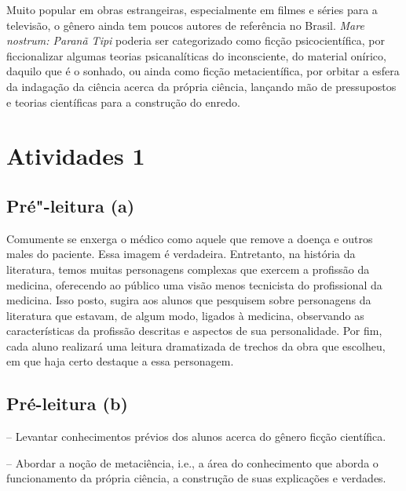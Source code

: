 \documentclass[12pt]{extarticle}
\begin{document}
Muito popular em obras estrangeiras, especialmente em filmes e séries para a televisão, o gênero ainda tem poucos autores de referência no Brasil. \textit{Mare nostrum: Paranã Tipi} poderia ser categorizado como ficção psicocientífica, por ficcionalizar algumas teorias psicanalíticas do inconsciente, do material onírico, daquilo que é o sonhado, ou ainda como ficção metacientífica, por orbitar a esfera da indagação da ciência acerca da própria ciência, lançando mão de pressupostos e teorias científicas para a construção do enredo.

\section{Atividades 1}

\subsection{Pré"-leitura (a)}

\bnccativividadespreleitura


Comumente se enxerga o médico como aquele que remove a
doença e outros males do paciente. Essa imagem é verdadeira. Entretanto,
na história da literatura, temos muitas personagens complexas que
exercem a profissão da medicina, oferecendo ao público uma visão menos
tecnicista do profissional da medicina. Isso posto, sugira aos alunos
que pesquisem sobre personagens da literatura que estavam, de algum
modo, ligados à medicina, observando as características da profissão
descritas e aspectos de sua personalidade. Por fim, cada aluno realizará
uma leitura dramatizada de trechos da obra que escolheu, em que haja
certo destaque a essa personagem.

\subsection{Pré-leitura (b)}

-- Levantar conhecimentos prévios dos alunos acerca do gênero ficção científica.

-- Abordar a noção de metaciência, i.e., a área do conhecimento que aborda o funcionamento da própria ciência, a construção de suas explicações e verdades.
\end{document}
